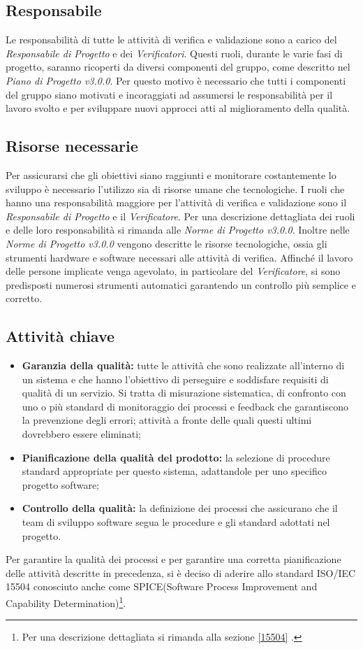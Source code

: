 \subsection{Responsabile}
Le responsabilità di tutte le attività di verifica e validazione sono a carico del \textit{Responsabile di Progetto} e dei \textit{Verificatori}. Questi ruoli, durante le varie fasi di progetto, saranno ricoperti da diversi componenti del gruppo, come descritto nel \textit{Piano di Progetto v3.0.0}. Per questo motivo è necessario che tutti i componenti del gruppo siano motivati e incoraggiati ad assumersi le responsabilità per il lavoro svolto e per sviluppare nuovi approcci atti al miglioramento della qualità.

\subsection{Risorse necessarie}
Per assicurarsi che gli obiettivi siano raggiunti e monitorare costantemente lo sviluppo è necessario l'utilizzo sia di risorse umane che tecnologiche. I ruoli che hanno una responsabilità maggiore per l'attività di verifica e validazione sono il \textit{Responsabile di Progetto} e il \textit{Verificatore}. Per una descrizione dettagliata dei ruoli e delle loro responsabilità si rimanda alle \textit{Norme di Progetto v3.0.0}. Inoltre nelle \textit{Norme di Progetto v3.0.0} vengono descritte le risorse tecnologiche, ossia gli strumenti hardware e software necessari alle attività di verifica. Affinché il lavoro delle persone implicate venga agevolato, in particolare del \textit{Verificatore}, si sono predisposti numerosi strumenti automatici garantendo un controllo più semplice e corretto.

\subsection{Attività chiave}
\begin{itemize}
	\item \textbf{Garanzia della qualità:} tutte le attività che sono realizzate all'interno di un sistema e che hanno l'obiettivo di perseguire e soddisfare requisiti di qualità di un servizio. Si tratta di misurazione sistematica, di confronto con uno o più standard di monitoraggio dei processi e \gls{feedback} che garantiscono la prevenzione degli errori; attività a fronte delle quali questi ultimi dovrebbero essere eliminati;
	\item \textbf{Pianificazione della qualità del prodotto:} la selezione di procedure standard appropriate per questo sistema, adattandole per uno specifico progetto software;
	\item \textbf{Controllo della qualità:} la definizione dei processi che assicurano che il team  di sviluppo software segua le procedure e gli standard adottati nel progetto.
\end{itemize}
Per garantire la qualità dei processi e per garantire una corretta pianificazione delle attività descritte in precedenza, si è deciso di aderire allo standard ISO/IEC 15504 conosciuto anche come SPICE(Software Process Improvement and Capability Determination)\footnote{Per una descrizione dettagliata si rimanda alla sezione \ref{15504} .}.
	
